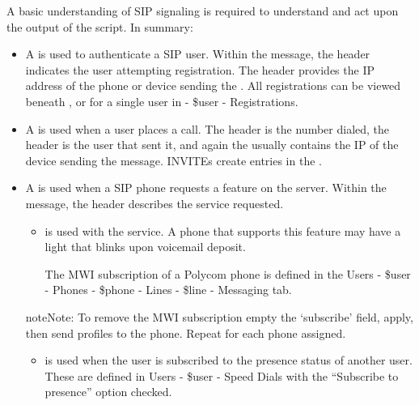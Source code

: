 \documentclass[letterpaper,10pt,english]{sphinxmanual}
\begin{document}
A basic understanding of SIP signaling is required to understand and act upon the output of the script. In summary:
\begin{itemize}
\item {} 
A  is used to authenticate a SIP user.
Within the  message, the  header indicates the user attempting registration.
The  header provides the IP address of the phone or device sending the .
All registrations can be viewed beneath {\hyperref[\detokenize{webui:diagnostics-registrations}]{}}, or for a single user in {\hyperref[\detokenize{webui:users}]{}} - \$user - Registrations.

\item {} 
A  is used when a user places a call.
The  header is the number dialed, the  header is the user that sent it, and again the  usually contains the IP of the device sending the message.
INVITEs create entries in the {\hyperref[\detokenize{webui:diagnostics-call-detail-records}]{}}.

\item {} 
A  is used when a SIP phone requests a feature on the server. Within the  message, the  header describes the service requested.
\begin{itemize}
\item {} 
 is used with the {\hyperref[\detokenize{webui:message-waiting-indicator}]{}} service.
A phone that supports this feature may have a light that blinks upon voicemail deposit.

The MWI subscription of a Polycom phone is defined in the Users - \$user - Phones - \$phone - Lines - \$line - Messaging tab.


\end{itemize}

\begin{sphinxadmonition}{note}{Note:}
To remove the MWI subscription empty the ‘subscribe’ field, apply, then send profiles to the phone. Repeat for each phone assigned.
\end{sphinxadmonition}
\begin{itemize}
\item {} 
 is used when the user is subscribed to the presence status of another user.
These are defined in Users - \$user - Speed Dials with the “Subscribe to presence” option checked.


\end{itemize}
\end{itemize}
\end{document}
